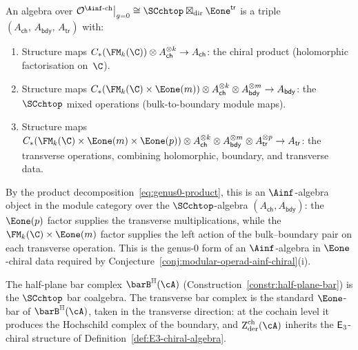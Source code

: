 \begin{remark}
\label{rem:algebras-genus0-ainf-chiral}
An algebra over
$\mathcal{O}^{\Ainf\text{-ch}}\big|_{g=0}
\cong \SCchtop\boxtimes_{\mathrm{dir}}\Eone^{\mathsf{tr}}$
is a triple
$(A_{\mathsf{ch}},\, A_{\mathsf{bdy}},\, A_{\mathsf{tr}})$
with:
\begin{enumerate}[label=\textup{(\alph*)}]
\item Structure maps
 $C_\ast(\FM_k(\C)) \otimes A_{\mathsf{ch}}^{\otimes k}
 \to A_{\mathsf{ch}}$:
 the chiral product (holomorphic factorisation on~$\C$).
\item Structure maps
 $C_\ast(\FM_k(\C) \times \Eone(m)) \otimes
 A_{\mathsf{ch}}^{\otimes k} \otimes
 A_{\mathsf{bdy}}^{\otimes m} \to A_{\mathsf{bdy}}$:
 the $\SCchtop$ mixed operations (bulk-to-boundary module maps).
\item Structure maps
 $C_\ast(\FM_k(\C) \times \Eone(m) \times \Eone(p))
 \otimes A_{\mathsf{ch}}^{\otimes k} \otimes
 A_{\mathsf{bdy}}^{\otimes m} \otimes
 A_{\mathsf{tr}}^{\otimes p} \to A_{\mathsf{tr}}$:
 the transverse operations, combining holomorphic, boundary,
 and transverse data.
\end{enumerate}
By the product decomposition~\eqref{eq:genus0-product},
this is an $\Ainf$-algebra object in the module category over the
$\SCchtop$-algebra $(A_{\mathsf{ch}},A_{\mathsf{bdy}})$: the
$\Eone(p)$ factor supplies the transverse multiplications, while the
$\FM_k(\C)\times\Eone(m)$ factor supplies the left action of the
bulk--boundary pair on each transverse operation. This is the
genus-$0$ form of an $\Ainf$-algebra in $\Eone$-chiral data required by
Conjecture~\ref{conj:modular-operad-ainf-chiral}(i).

The half-plane bar complex
$\barB^{\mathbb{H}}(\cA)$
(Construction~\ref{constr:half-plane-bar}) is the
$\SCchtop$ bar coalgebra. The transverse bar complex is
the standard $\Eone$-bar of $\barB^{\mathbb{H}}(\cA)$,
taken in the transverse direction: at the cochain level
it produces the Hochschild complex of the boundary, and
$\Zder^{\mathrm{ch}}(\cA)$ inherits the $\mathsf{E}_3$-chiral
structure of Definition~\ref{def:E3-chiral-algebra}.
\end{remark}

